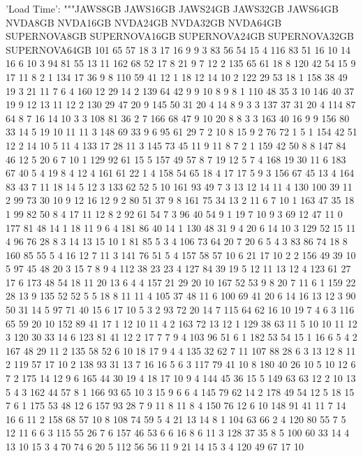 \begin{pyverbatim}
{	'Load Time': """JAWS8GB	JAWS16GB	JAWS24GB	JAWS32GB	JAWS64GB	NVDA8GB	NVDA16GB	NVDA24GB	NVDA32GB	NVDA64GB	SUPERNOVA8GB	SUPERNOVA16GB	SUPERNOVA24GB	SUPERNOVA32GB	SUPERNOVA64GB
	101	65	57	18	3	17	16	9	9	3	83	56	54	15	4
	116	83	51	16	10	14	16	6	10	3	94	81	55	13	11
	162	68	52	17	8	21	9	7	12	2	135	65	61	18	8
	120	42	54	15	9	17	11	8	2	1	134	17	36	9	8
	110	59	41	12	1	18	12	14	10	2	122	29	53	18	1
	158	38	49	19	3	21	11	7	6	4	160	12	29	14	2
	139	64	42	9	9	10	8	9	8	1	110	48	35	3	10
	146	40	37	19	9	12	13	11	12	2	130	29	47	20	9
	145	50	31	20	4	14	8	9	3	3	137	37	31	20	4
	114	87	64	8	7	16	14	10	3	3	108	81	36	2	7
	166	68	47	9	10	20	8	8	3	3	163	40	16	9	9
	156	80	33	14	5	19	10	11	11	3	148	69	33	9	6
	95	61	29	7	2	10	8	15	9	2	76	72	1	5	1
	154	42	51	12	2	14	10	5	11	4	133	17	28	11	3
	145	73	45	11	9	11	8	7	2	1	159	42	50	8	8
	147	84	46	12	5	20	6	7	10	1	129	92	61	15	5
	157	49	57	8	7	19	12	5	7	4	168	19	30	11	6
	183	67	40	5	4	19	8	4	12	4	161	61	22	1	4
	158	54	65	18	4	17	17	5	9	3	156	67	45	13	4
	164	83	43	7	11	18	14	5	12	3	133	62	52	5	10
	161	93	49	7	3	13	12	14	11	4	130	100	39	11	2
	99	73	30	10	9	12	16	12	9	2	80	51	37	9	8
	161	75	34	13	2	11	6	7	10	1	163	47	35	18	1
	99	82	50	8	4	17	11	12	8	2	92	61	54	7	3
	96	40	54	9	1	19	7	10	9	3	69	12	47	11	0
	177	81	48	14	1	18	11	9	6	4	181	86	40	14	1
	130	48	31	9	4	20	6	14	10	3	129	52	15	11	4
	96	76	28	8	3	14	13	15	10	1	81	85	5	3	4
	106	73	64	20	7	20	6	5	4	3	83	86	74	18	8
	160	85	55	5	4	16	12	7	11	3	141	76	51	5	4
	157	58	57	10	6	21	17	10	2	2	156	49	39	10	5
	97	45	48	20	3	15	7	8	9	4	112	38	23	23	4
	127	84	39	19	5	12	11	13	12	4	123	61	27	17	6
	173	48	54	18	11	20	13	6	4	4	157	21	29	20	10
	167	52	53	9	8	20	7	11	6	1	159	22	28	13	9
	135	52	52	5	5	18	8	11	11	4	105	37	48	11	6
	100	69	41	20	6	14	16	13	12	3	90	50	31	14	5
	97	71	40	15	6	17	10	5	3	2	93	72	20	14	7
	115	64	62	16	10	19	7	4	6	3	116	65	59	20	10
	152	89	41	17	1	12	10	11	4	2	163	72	13	12	1
	129	38	63	11	5	10	10	11	12	3	120	30	33	14	6
	123	81	41	12	2	17	7	7	9	4	103	96	51	6	1
	182	53	54	15	1	16	6	5	4	2	167	48	29	11	2
	135	58	52	6	10	18	17	9	4	4	135	32	62	7	11
	107	88	28	6	3	13	12	8	11	2	119	57	17	10	2
	138	93	31	13	7	16	16	5	6	3	117	79	41	10	8
	180	40	26	10	5	10	12	6	7	2	175	14	12	9	6
	165	44	30	19	4	18	17	10	9	4	144	45	36	15	5
	149	63	63	12	2	10	13	5	4	3	162	44	57	8	1
	166	93	65	10	3	15	9	6	6	4	145	79	62	14	2
	178	49	54	12	5	18	15	7	6	1	175	53	48	12	6
	157	93	28	7	9	11	8	11	8	4	150	76	12	6	10
	148	91	41	11	7	14	16	6	11	2	158	68	57	10	8
	108	74	59	5	4	21	13	14	8	1	104	63	66	2	4
	120	80	55	7	5	12	11	6	6	3	115	55	26	7	6
	157	46	53	6	6	16	8	6	11	3	128	37	35	8	5
	100	60	33	14	4	13	10	15	3	4	70	74	6	20	5
	112	56	56	11	9	21	14	15	3	4	120	49	67	17	10
}
\end{pyverbatim}
